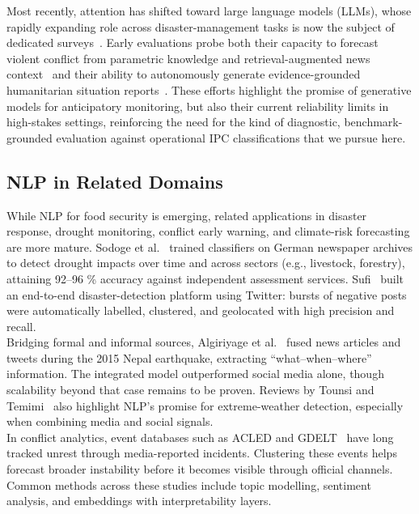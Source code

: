 \documentclass{article}
\begin{document}
Most recently, attention has shifted toward large language models (LLMs), whose rapidly expanding role across disaster-management tasks is now the subject of dedicated surveys~\citep{Lei2025}. Early evaluations probe both their capacity to forecast violent conflict from parametric knowledge and retrieval-augmented news context~\citep{Nemkova2025} and their ability to autonomously generate evidence-grounded humanitarian situation reports~\citep{Decostanzi2025}. These efforts highlight the promise of generative models for anticipatory monitoring, but also their current reliability limits in high-stakes settings, reinforcing the need for the kind of diagnostic, benchmark-grounded evaluation against operational IPC classifications that we pursue here.\\


\subsection{NLP in Related Domains}

While NLP for food security is emerging, related applications in disaster response, drought monitoring, conflict early warning, and climate-risk forecasting are more mature. Sodoge et al.~\citep{Sodoge2023} trained classifiers on German newspaper archives to detect drought impacts over time and across sectors (e.g., livestock, forestry), attaining 92–96 \% accuracy against independent assessment services. Sufi~\citep{Sufi2022} built an end-to-end disaster-detection platform using Twitter: bursts of negative posts were automatically labelled, clustered, and geolocated with high precision and recall. \\

Bridging formal and informal sources, Algiriyage et al.~\citep{Algiriyage2023} fused news articles and tweets during the 2015 Nepal earthquake, extracting “what–when–where” information. The integrated model outperformed social media alone, though scalability beyond that case remains to be proven. Reviews by Tounsi and Temimi~\citep{ExtremeWeatherReview2023} also highlight NLP's promise for extreme-weather detection, especially when combining media and social signals. \\

In conflict analytics, event databases such as ACLED and GDELT~\citep{GDELT2022} have long tracked unrest through media-reported incidents. Clustering these events helps forecast broader instability before it becomes visible through official channels. Common methods across these studies include topic modelling, sentiment analysis, and embeddings with interpretability layers.
\end{document}
